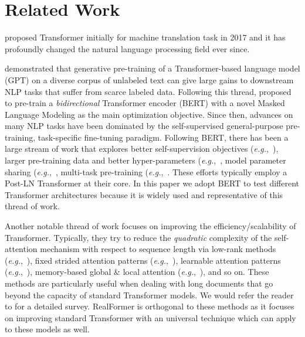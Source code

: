 \documentclass[11pt,a4paper]{article}
\begin{document}
\section{Related Work}
\citet{Vaswani-2017-attention} proposed Transformer initially for machine translation task in 2017 and it has profoundly changed the natural language processing field ever since. 

\citet{Radford-2018-gpt1} demonstrated that generative pre-training of a Transformer-based language model (GPT) on a diverse corpus of unlabeled text can give large gains to downstream NLP tasks that suffer from scarce labeled data. Following this thread, \citet{Devlin-2019-bert} proposed to pre-train a \emph{bidirectional} Transformer encoder (BERT) with a novel Masked Language Modeling as the main optimization objective. Since then, advances on many NLP tasks have been dominated by the self-supervised general-purpose pre-training, task-specific fine-tuning paradigm.
Following BERT, there has been a large stream of work that explores better self-supervision objectives (\emph{e.g.},~\citet{Yang-2019-xlnet,Clark-2020-electra}), larger pre-training data and better hyper-parameters (\emph{e.g.},~\citet{Liu-2019-roberta}, model parameter sharing (\emph{e.g.},~\citet{Lan-2019-albert}, multi-task pre-training (\emph{e.g.},~\citet{Sun-2019-ernie2,Raffel-2019-t5}.
These efforts typically employ a Post-LN Transformer at their core. In this paper we adopt BERT to test different Transformer architectures because it is widely used and representative of this thread of work.

Another notable thread of work focuses on improving the efficiency/scalability of Transformer. Typically, they try to reduce the \emph{quadratic} complexity of the self-attention mechanism with respect to sequence length via low-rank methods (\emph{e.g.},~\citet{Wang-2020-linformer}), fixed strided attention patterns (\emph{e.g.},~\citet{Child-2019-sparsetransformer}), learnable attention patterns (\emph{e.g.},~\citet{Kitaev-2020-reformer, Roy-2020-routingtransformer}), memory-based global \& local attention (\emph{e.g.},~\citet{Ainslie-2020-etc, Beltagy-2020-longformer, Zaheer-2020-bigbird}), and so on. 
These methods are particularly useful when dealing with long documents that go beyond the capacity of standard Transformer models. We would refer the reader to \citet{Tay-2020-survey} for a detailed survey.
RealFormer is orthogonal to these methods as it focuses on improving standard Transformer with an universal technique which can apply to these models as well. 
\end{document}
